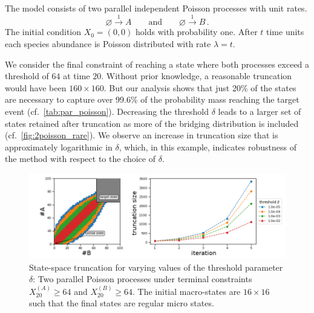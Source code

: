 \begin{model}\label{model:par_poisson}
  The model consists of two parallel independent Poisson processes
  with unit rates.
  $$ \varnothing \xrightarrow{1} A \qquad\text{and}\qquad \varnothing
  \xrightarrow{1} B\,. $$
  The initial condition $X_0=(0,0)$ holds with probability one. After
  $t$ time units each species abundance
  is Poisson distributed with rate $\lambda=t$.
\end{model}
We consider the final constraint of reaching a state where both
processes exceed a threshold of $64$ at time $20$.
Without prior knowledge, a reasonable truncation would have been
$160\times 160$. But our analysis shows that just \num{20}\% of the
states are necessary to capture over \num{99.6}\% of the probability
mass reaching the
target event (cf.\ \autoref{tab:par_poisson}).
Decreasing the threshold $\delta$ leads to a larger set of states
retained after truncation as more of the bridging distribution is
included (cf.\ \autoref{fig:2poisson_rare}).
We observe an increase in truncation size that is approximately
logarithmic in $\delta$, which, in this example, indicates robustness
of the method with respect to the choice of $\delta$.
\begin{figure}[!t]
  \centering
  \includegraphics[width=\textwidth]{gfx/truncs.png}
  \caption[State-space truncation for varying values of the
  threshold parameter $\delta$]{State-space truncation for varying values of the
    threshold parameter $\delta$: Two parallel Poisson processes
    under terminal constraints $X_{20}^{(A)} \geq 64$ and $X_{20}^{(B)}\geq 64$.
    The initial macro-states are $16\times 16$ such that the final
  states are regular micro states.}
  \label{fig:2poisson_rare}
\end{figure}


